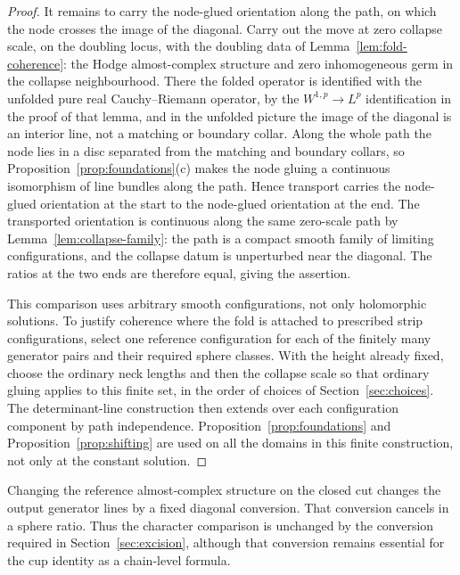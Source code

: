 \documentclass[11pt]{amsart}
\theoremstyle{definition}
\theoremstyle{remark}
\theoremstyle{plain}
\numberwithin{equation}{section}
\begin{document}
\begin{proof}
It remains to carry the node-glued orientation along the path, on
which the node crosses the image of the diagonal. Carry out the move at
zero collapse scale, on the doubling locus, with the doubling data of
Lemma~\ref{lem:fold-coherence}: the Hodge almost-complex structure and
zero inhomogeneous germ in the collapse neighbourhood. There the folded
operator is identified with the unfolded pure real Cauchy--Riemann
operator, by the $W^{1,p}\to L^p$ identification in the proof of that
lemma, and in the unfolded picture the image of the diagonal is an
interior line, not a matching or boundary collar. Along the whole path
the node lies in a disc separated from the matching and boundary
collars, so Proposition~\ref{prop:foundations}(c) makes the node gluing
a continuous isomorphism of line bundles along the path. Hence transport
carries the node-glued orientation at the start to the node-glued
orientation at the end. The transported orientation is continuous along
the same zero-scale path by Lemma~\ref{lem:collapse-family}: the path is
a compact smooth family of limiting configurations, and the collapse
datum is unperturbed near the diagonal. The ratios at the two ends are
therefore equal, giving the assertion.

This comparison uses arbitrary smooth
configurations, not only holomorphic
solutions. To justify coherence where
the fold is attached to prescribed
strip configurations, select one
reference configuration for each of the
finitely many generator pairs and their
required sphere classes. With the
height already fixed, choose the
ordinary neck lengths and then the
collapse scale so that ordinary gluing
applies to this finite set, in the order
of choices of Section~\ref{sec:choices}. The determinant-line construction
then extends over each configuration
component by path independence.
Proposition~\ref{prop:foundations} and
Proposition~\ref{prop:shifting} are
used on all the domains in this
finite construction, not only at the
constant solution.
\end{proof}

Changing the reference almost-complex
structure on the closed cut changes the output generator
lines by a fixed diagonal conversion.
That conversion cancels in a sphere
ratio. Thus the character comparison is
unchanged by the conversion required in
Section~\ref{sec:excision}, although that
conversion remains essential for the
cup identity as a chain-level formula.
\end{document}
